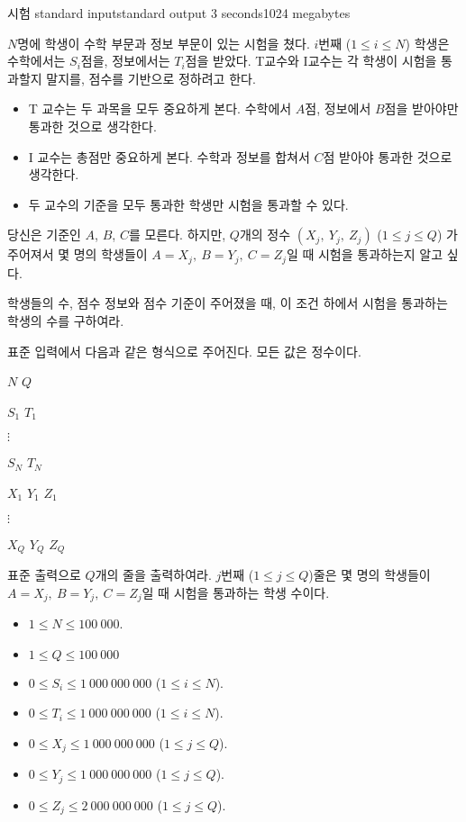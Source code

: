 \begin{problem}{시험}
	{standard input}{standard output}
	{3 seconds}{1024 megabytes}{}
	
	$N$명에 학생이 수학 부문과 정보 부문이 있는 시험을 쳤다. $i$번째 ($1 \le i \le N$) 학생은 수학에서는 $S_i$점을, 정보에서는 $T_i$점을 받았다. T교수와 I교수는 각 학생이 시험을 통과할지 말지를, 점수를 기반으로 정하려고 한다.
	
	\begin{itemize}
		\item T 교수는 두 과목을 모두 중요하게 본다. 수학에서 $A$점, 정보에서 $B$점을 받아야만 통과한 것으로 생각한다.
		\item I 교수는 총점만 중요하게 본다. 수학과 정보를 합쳐서 $C$점 받아야 통과한 것으로 생각한다.
		\item 두 교수의 기준을 모두 통과한 학생만 시험을 통과할 수 있다.
	\end{itemize}

	당신은 기준인 $A$, $B$, $C$를 모른다. 하지만, $Q$개의 정수 $(X_j,\ Y_j,\ Z_j)$ ($1 \le j \le Q$) 가 주어져서 몇 명의 학생들이 $A=X_j,\ B=Y_j,\ C=Z_j$일 때 시험을 통과하는지 알고 싶다.
	
	학생들의 수, 점수 정보와 점수 기준이 주어졌을 때, 이 조건 하에서 시험을 통과하는 학생의 수를 구하여라.

	\InputFile
	
	표준 입력에서 다음과 같은 형식으로 주어진다. 모든 값은 정수이다.

	$N$ $Q$
	
	$S_1$ $T_1$
	
	$\vdots$
	
	$S_N$ $T_N$

	$X_1$ $Y_1$ $Z_1$

	$\vdots$
	
	$X_Q$ $Y_Q$ $Z_Q$

	
	\OutputFile
	
	표준 출력으로 $Q$개의 줄을 출력하여라. $j$번째 ($1 \le j \le Q$)줄은 몇 명의 학생들이 $A=X_j,\ B=Y_j,\ C=Z_j$일 때 시험을 통과하는 학생 수이다.
	
	\Constraints
	
	\begin{itemize}
	
	\item $1 \le N \le 100\ 000$.
	\item $1 \le Q \le 100\ 000$
	\item $0 \le S_i \le 1\ 000\ 000\ 000$ ($1 \le i \le N$).
	\item $0 \le T_i \le 1\ 000\ 000\ 000$ ($1 \le i \le N$).
	\item $0 \le X_j \le 1\ 000\ 000\ 000$ ($1 \le j \le Q$).
	\item $0 \le Y_j \le 1\ 000\ 000\ 000$ ($1 \le j \le Q$).
	\item $0 \le Z_j \le 2\ 000\ 000\ 000$ ($1 \le j \le Q$).
		

\end{itemize}
\end{problem}
